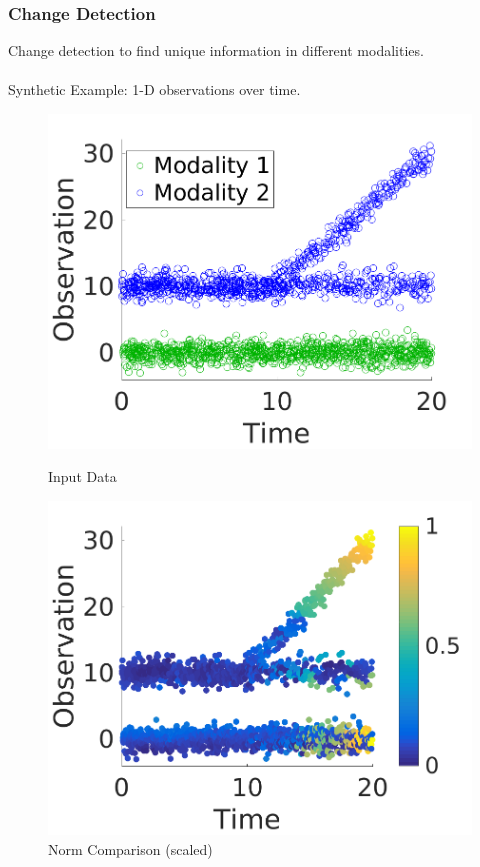 \documentclass{beamer}
\begin{document}

\begin{frame}
  \frametitle{Change Detection}
  Change detection to find unique information in different modalities.\\~\\
  Synthetic Example: 1-D observations over time.
  \begin{figure}[ht]
    \centering
    \begin{minipage}[b]{0.45\linewidth}
      \centering
      \includegraphics[width=\textwidth]{./Images/ChangeDetect/Synthetic/data.png}
      \caption{Input Data}
    \end{minipage}
    \hfill
      \begin{minipage}[b]{0.45\linewidth}
      \centering
      \includegraphics[width=\textwidth]{./Images/ChangeDetect/Synthetic/norms.png}
      \caption{Norm Comparison (scaled)}
    \end{minipage}
  \end{figure}
\end{frame}
\end{document}
